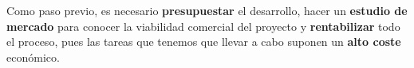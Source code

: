 Como paso previo, es necesario \textbf{presupuestar} el desarrollo, hacer un \textbf{estudio de mercado} para conocer la viabilidad comercial del proyecto y \textbf{rentabilizar} todo el proceso, pues las tareas que tenemos que llevar a cabo suponen un \textbf{alto coste} económico.

\newpage
\clearpage{\pagestyle{empty}\cleardoublepage}